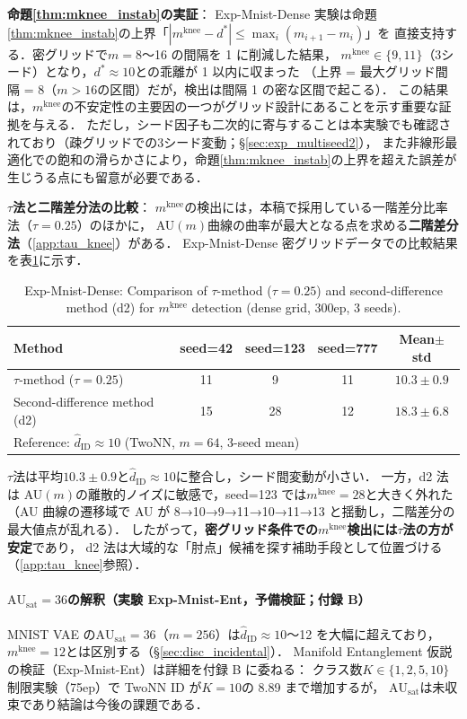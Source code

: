\documentclass[11pt,a4paper]{jsarticle}
\newcommand{\AUsat}{\mathrm{AU}_{\mathrm{sat}}}
\newcommand{\mknee}{m^{\mathrm{knee}}}
\begin{document}
\noindent
\textbf{命題\ref{thm:mknee_instab}の実証}：
Exp-Mnist-Dense 実験は命題\ref{thm:mknee_instab}の上界「$|\mknee - d^*| \leq \max_i(m_{i+1} - m_i)$」を
直接支持する．密グリッドで$m = 8$〜16 の間隔を 1 に削減した結果，
$\mknee \in \{9, 11\}$（3シード）となり，$d^* \approx 10$との乖離が 1 以内に収まった
（上界 = 最大グリッド間隔 = 8（$m > 16$の区間）だが，検出は間隔 1 の密な区間で起こる）．
この結果は，$\mknee$の不安定性の主要因の一つがグリッド設計にあることを示す重要な証拠を与える．
ただし，シード因子も二次的に寄与することは本実験でも確認されており（疎グリッドでの3シード変動；§\ref{sec:exp_multiseed2}），
また非線形最適化での飽和の滑らかさにより，命題\ref{thm:mknee_instab}の上界を超えた誤差が生じうる点にも留意が必要である．

\noindent
\textbf{$\tau$法と二階差分法の比較}：
$\mknee$の検出には，本稿で採用している一階差分比率法（$\tau = 0.25$）のほかに，
AU$(m)$曲線の曲率が最大となる点を求める\textbf{二階差分法}（\ref{app:tau_knee}）がある．
Exp-Mnist-Dense 密グリッドデータでの比較結果を表\ref{tab:el_knee_compare}に示す．

\begin{table}[H]
\centering
\caption{Exp-Mnist-Dense: Comparison of $\tau$-method ($\tau=0.25$) and second-difference method (d2) for $\mknee$ detection (dense grid, 300ep, 3 seeds).}
\label{tab:el_knee_compare}
\small
\begin{tabular}{lcccc}
\toprule
Method & seed=42 & seed=123 & seed=777 & Mean$\pm$std \\
\midrule
$\tau$-method ($\tau=0.25$) & 11 & 9  & 11 & $10.3 \pm 0.9$ \\
Second-difference method (d2) & 15 & 28 & 12 & $18.3 \pm 6.8$ \\
\midrule
\multicolumn{5}{l}{Reference: $\hat{d}_\mathrm{ID} \approx 10$ (TwoNN, $m=64$, 3-seed mean)} \\
\bottomrule
\end{tabular}
\end{table}

$\tau$法は平均$10.3 \pm 0.9$と$\hat{d}_\mathrm{ID} \approx 10$に整合し，シード間変動が小さい．
一方，d2 法は AU$(m)$の離散的ノイズに敏感で，seed=123 では$\mknee = 28$と大きく外れた
（AU 曲線の遷移域で AU が 8→10→9→11→10→11→13 と揺動し，二階差分の最大値点が乱れる）．
したがって，\textbf{密グリッド条件での$\mknee$検出には$\tau$法の方が安定}であり，
d2 法は大域的な「肘点」候補を探す補助手段として位置づける（\ref{app:tau_knee}参照）．

\paragraph{$\AUsat = 36$の解釈（実験 Exp-Mnist-Ent，予備検証；付録 B）}
MNIST VAE の$\AUsat = 36$（$m=256$）は$\hat{d}_\mathrm{ID} \approx 10$〜12 を大幅に超えており，
$\mknee = 12$とは区別する（§\ref{sec:disc_incidental}）．
Manifold Entanglement 仮説の検証（Exp-Mnist-Ent）は詳細を付録 B に委ねる：
クラス数$K \in \{1,2,5,10\}$制限実験（75ep）で TwoNN ID が$K=10$の 8.89 まで増加するが，
$\AUsat$は未収束であり結論は今後の課題である．
\end{document}
